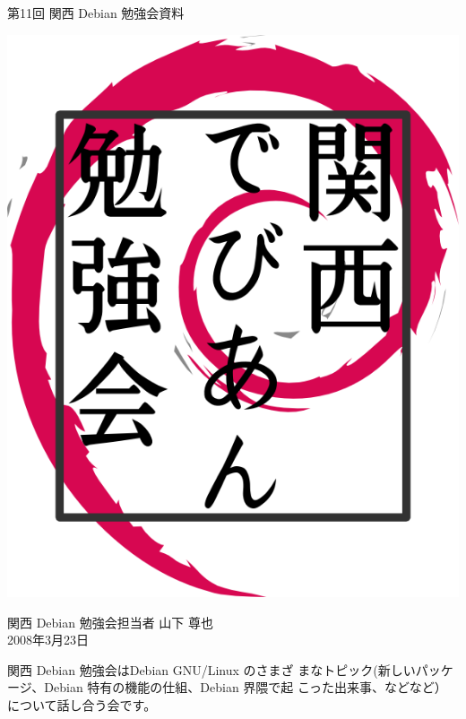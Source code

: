 \documentclass[mingoth,a4paper]{jsarticle}
\newcommand{\debmtgyear}{2008}
\newcommand{\debmtgdate}{23}
\newcommand{\debmtgmonth}{3}
\newcommand{\debmtgnumber}{11}
\begin{document}
\begin{titlepage}


 第\debmtgnumber{}回 関西 Debian 勉強会資料

\vspace{2cm}

\begin{center}
\includegraphics{image200802/kansaidebianlogo.png}
\end{center}

\begin{flushright}
\hfill{}関西 Debian 勉強会担当者 山下 尊也\\
\hfill{}\debmtgyear{}年\debmtgmonth{}月\debmtgdate{}日
\end{flushright}

\thispagestyle{empty}
\end{titlepage}

 
 関西 Debian 勉強会はDebian GNU/Linux のさまざ
 まなトピック(新しいパッケージ、Debian 特有の機能の仕組、Debian 界隈で起
 こった出来事、などなど）について話し合う会です。
\end{document}
